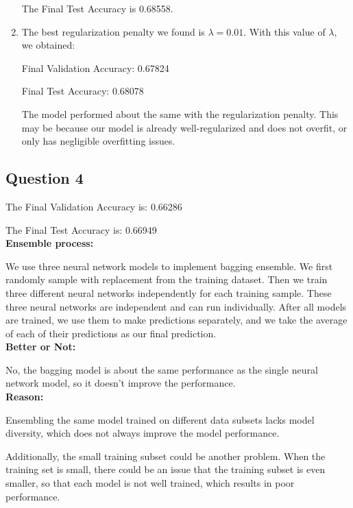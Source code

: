 \documentclass{article}
\begin{document}
\begin{enumerate}[label=(\alph*)]
    The Final Test Accuracy is 0.68558.

    \item The best regularization penalty we found is $\lambda = 0.01$. With this value of $\lambda$, we obtained:
    
    Final Validation Accuracy: 0.67824

    Final Test Accuracy: 0.68078

    The model performed about the same with the regularization penalty. This may be because our model is already well-regularized and does not overfit, or only has negligible overfitting issues.
\end{enumerate}

\newpage

\subsection*{Question 4}

The Final Validation Accuracy is: 0.66286

The Final Test Accuracy is: 0.66949 \\

\textbf{Ensemble process:}

We use three neural network models to implement bagging ensemble. We first randomly sample with replacement from the training dataset. Then we train three different neural networks independently for each training sample. These three neural networks are independent and can run individually. After all models are trained, we use them to make predictions separately, and we take the average of each of their predictions as our final prediction. \\

\textbf{Better or Not:}

No, the bagging model is about the same performance as the single neural network model, so it doesn't improve the performance. \\

\textbf{Reason:}

Ensembling the same model trained on different data subsets lacks model diversity, which does not always improve the model performance.

Additionally, the small training subset could be another problem. When the training set is small, there could be an issue that the training subset is even smaller, so that each model is not well trained, which results in poor performance.

\newpage
\end{document}
